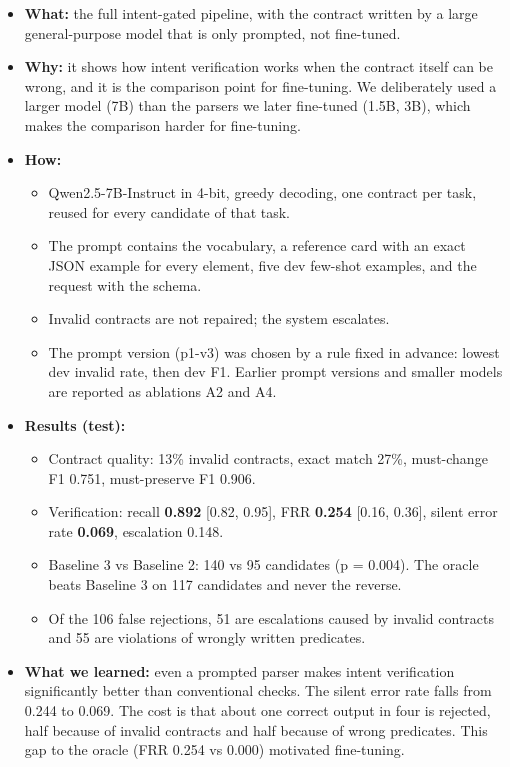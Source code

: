 \documentclass[11pt]{article}
\providecommand{\tightlist}{\setlength{\itemsep}{0pt}\setlength{\parskip}{0pt}}
\begin{document}
\begin{itemize}
\tightlist
\item
  \textbf{What:} the full intent-gated pipeline, with the contract
  written by a large general-purpose model that is only prompted, not
  fine-tuned.
\item
  \textbf{Why:} it shows how intent verification works when the contract
  itself can be wrong, and it is the comparison point for fine-tuning.
  We deliberately used a larger model (7B) than the parsers we later
  fine-tuned (1.5B, 3B), which makes the comparison harder for
  fine-tuning.
\item
  \textbf{How:}

  \begin{itemize}
  \tightlist
  \item
    Qwen2.5-7B-Instruct in 4-bit, greedy decoding, one contract per
    task, reused for every candidate of that task.
  \item
    The prompt contains the vocabulary, a reference card with an exact
    JSON example for every element, five dev few-shot examples, and the
    request with the schema.
  \item
    Invalid contracts are not repaired; the system escalates.
  \item
    The prompt version (p1-v3) was chosen by a rule fixed in advance:
    lowest dev invalid rate, then dev F1. Earlier prompt versions and
    smaller models are reported as ablations A2 and A4.
  \end{itemize}
\item
  \textbf{Results (test):}

  \begin{itemize}
  \tightlist
  \item
    Contract quality: 13\% invalid contracts, exact match 27\%,
    must-change F1 0.751, must-preserve F1 0.906.
  \item
    Verification: recall \textbf{0.892} {[}0.82, 0.95{]}, FRR
    \textbf{0.254} {[}0.16, 0.36{]}, silent error rate \textbf{0.069},
    escalation 0.148.
  \item
    Baseline 3 vs Baseline 2: 140 vs 95 candidates (p = 0.004). The
    oracle beats Baseline 3 on 117 candidates and never the reverse.
  \item
    Of the 106 false rejections, 51 are escalations caused by invalid
    contracts and 55 are violations of wrongly written predicates.
  \end{itemize}
\item
  \textbf{What we learned:} even a prompted parser makes intent
  verification significantly better than conventional checks. The silent
  error rate falls from 0.244 to 0.069. The cost is that about one
  correct output in four is rejected, half because of invalid contracts
  and half because of wrong predicates. This gap to the oracle (FRR
  0.254 vs 0.000) motivated fine-tuning.
\end{itemize}
\end{document}
